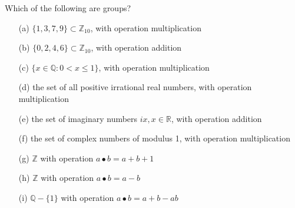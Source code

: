   \begin{exercise}[Shifrin 6.1.1]
    Which of the following are groups?
    \begin{enumerate}
      \item[(a)] $\{1,3,7,9\} \subset \mathbb{Z}_{10}$, with operation multiplication
      \item[(b)] $\{0,2,4,6\} \subset \mathbb{Z}_{10}$, with operation addition
      \item[(c)] $\{x \in \mathbb{Q} : 0 < x \leq 1\}$, with operation multiplication
      \item[(d)] the set of all positive irrational real numbers, with operation multiplication
      \item[(e)] the set of imaginary numbers $ix, x \in \mathbb{R}$, with operation addition
      \item[(f)] the set of complex numbers of modulus 1, with operation multiplication
      \item[(g)] $\mathbb{Z}$ with operation $a \bullet b = a + b + 1$
      \item[(h)] $\mathbb{Z}$ with operation $a \bullet b = a - b$
      \item[(i)] $\mathbb{Q} - \{1\}$ with operation $a \bullet b = a + b - ab$
    \end{enumerate}
  \end{exercise}

